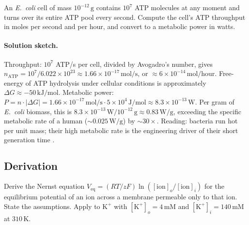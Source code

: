 \begin{exercise}
An \emph{E.~coli} cell of mass $10^{-12}\,\text{g}$ contains $10^7$
ATP molecules at any moment and turns over its entire ATP pool every
second. Compute the cell's ATP throughput in moles per second and per
hour, and convert to a metabolic power in watts.
\end{exercise}

\paragraph{Solution sketch.}
Throughput: $10^7$ ATP/s per cell, divided by Avogadro's number,
gives $n_{\text{ATP}} = 10^7 / 6.022 \times 10^{23}
\approx 1.66 \times 10^{-17}\,\text{mol/s}$, or
$\approx 6 \times 10^{-14}\,\text{mol/hour}$. Free-energy of ATP
hydrolysis under cellular conditions is approximately
$\Delta G \approx -50\,\text{kJ/mol}$. Metabolic power:
$P = n \cdot |\Delta G|
= 1.66 \times 10^{-17}\,\text{mol/s} \cdot 5 \times 10^4\,\text{J/mol}
\approx 8.3 \times 10^{-13}\,\text{W}$. Per gram of \emph{E.~coli}
biomass, this is
$8.3 \times 10^{-13}\,\text{W} / 10^{-12}\,\text{g}
\approx 0.83\,\text{W/g}$, exceeding the specific metabolic rate of a
human ($\sim 0.025\,\text{W/g}$) by $\sim 30\times$. Reading: bacteria
run hot per unit mass; their high metabolic rate is the engineering
driver of their short generation time \cite{text:v6c01-bionumbers-2015}.

\subsection*{Derivation}

\begin{exercise}
Derive the Nernst equation $V_{\text{eq}} = (RT/zF) \ln([\text{ion}]_o/
[\text{ion}]_i)$ for the equilibrium potential of an ion across a
membrane permeable only to that ion. State the assumptions. Apply to
$\text{K}^+$ with $[\text{K}^+]_o = 4\,\text{mM}$ and
$[\text{K}^+]_i = 140\,\text{mM}$ at $310\,\si{\kelvin}$.
\end{exercise}

